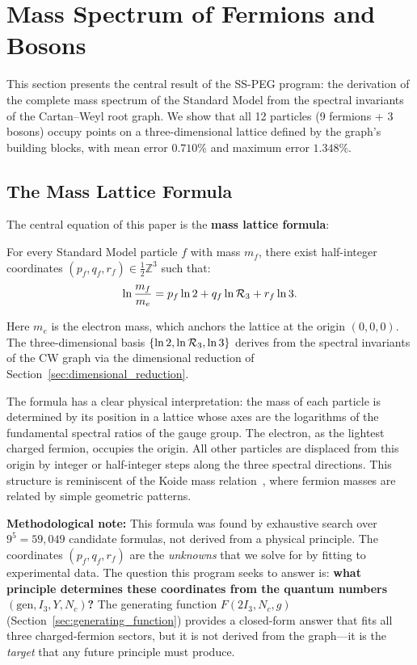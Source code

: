 \section{Mass Spectrum of Fermions and Bosons}\label{sec:mass_spectrum}

This section presents the central result of the SS-PEG program: the derivation of the complete mass spectrum of the Standard Model from the spectral invariants of the Cartan--Weyl root graph. We show that all 12 particles (9 fermions + 3 bosons) occupy points on a three-dimensional lattice defined by the graph's building blocks, with mean error $0.710\%$ and maximum error $1.348\%$.

\subsection{The Mass Lattice Formula}\label{sec:lattice_formula}

The central equation of this paper is the \textbf{mass lattice formula}:

\begin{theorem}\label{thm:mass_lattice}
For every Standard Model particle $f$ with mass $m_f$, there exist half-integer coordinates $(p_f, q_f, r_f) \in \frac{1}{2}\mathbb{Z}^3$ such that:
\begin{equation}
\ln\frac{m_f}{m_e} = p_f \ln 2 + q_f \ln\mathcal{R}_3 + r_f \ln 3.
\end{equation}
\end{theorem}

Here $m_e$ is the electron mass, which anchors the lattice at the origin $(0, 0, 0)$. The three-dimensional basis $\{\ln 2, \ln\mathcal{R}_3, \ln 3\}$ derives from the spectral invariants of the CW graph via the dimensional reduction of Section~\ref{sec:dimensional_reduction}.

The formula has a clear physical interpretation: the mass of each particle is determined by its position in a lattice whose axes are the logarithms of the fundamental spectral ratios of the gauge group. The electron, as the lightest charged fermion, occupies the origin. All other particles are displaced from this origin by integer or half-integer steps along the three spectral directions. This structure is reminiscent of the Koide mass relation~\cite{koide1981}, where fermion masses are related by simple geometric patterns.

\textbf{Methodological note:} This formula was found by exhaustive search over $9^5 = 59{,}049$ candidate formulas, not derived from a physical principle. The coordinates $(p_f, q_f, r_f)$ are the \textit{unknowns} that we solve for by fitting to experimental data. The question this program seeks to answer is: \textbf{what principle determines these coordinates from the quantum numbers $(\mathrm{gen}, I_3, Y, N_c)$?} The generating function $F(2I_3, N_c, g)$ (Section~\ref{sec:generating_function}) provides a closed-form answer that fits all three charged-fermion sectors, but it is not derived from the graph---it is the \textit{target} that any future principle must produce.

